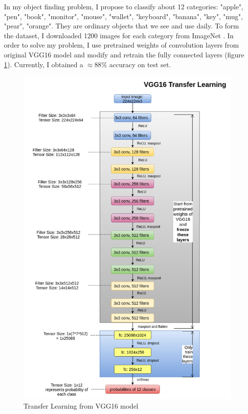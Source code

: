 In my object finding problem, I propose to classify about 12 categories: "apple", "pen", "book", "monitor", "mouse", "wallet", "keyboard", "banana", "key", "mug", "pear", "orange". They are ordinary objects that we see and use daily. To form the dataset, I downloaded 1200 images for each category from ImageNet \cite{imagenet_cvpr09}. In order to solve my problem, I use pretrained weights of convolution layers from original VGG16 model \cite{WeightsVGG:2016} and modify and retrain the fully connected layers (figure \ref{fig:transferedVgg16}). Currently, I obtained a $\approx88\%$ accuracy on test set.
\begin{figure}[tb]
	\centering
	\includegraphics[width=0.9\hsize]{./figures/transferedVgg16}
	\caption{Transfer Learning from VGG16 model}
	\label{fig:transferedVgg16}
\end{figure}
